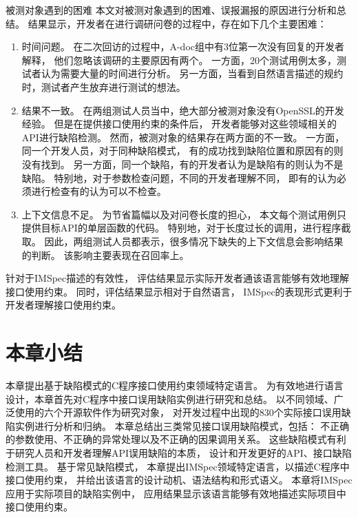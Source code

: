 {\kaishu 被测对象遇到的困难 }
本文对被测对象遇到的困难、误报漏报的原因进行分析和总结。
结果显示，开发者在进行调研问卷的过程中，存在如下几个主要困难：
\begin{enumerate}
	\item 时间问题。
	在二次回访的过程中，A-doc组中有3位第一次没有回复的开发者解释，
	他们忽略该调研的主要原因有两个。
	一方面，20个测试用例太多，测试者认为需要大量的时间进行分析。
	另一方面，当看到自然语言描述的规约时，测试者产生放弃进行测试的想法。
	\item 结果不一致。
	在两组测试人员当中，绝大部分被测对象没有OpenSSL的开发经验。
	但是在提供接口使用约束的条件后，
	开发者能够对这些领域相关的API进行缺陷检测。
	然而，被测对象的结果存在两方面的不一致。
	一方面，同一个开发人员，对于同种缺陷模式，
	有的成功找到缺陷位置和原因有的则没有找到。
	另一方面，同一个缺陷，有的开发者认为是缺陷有的则认为不是缺陷。
	特别地，对于参数检查问题，不同的开发者理解不同，
	即有的认为必须进行检查有的认为可以不检查。
	\item 上下文信息不足。
	为节省篇幅以及对问卷长度的担心，
	本文每个测试用例只提供目标API的单层函数的代码。
	特别地，对于长度过长的调用，进行程序截取。
	因此，两组测试人员都表示，很多情况下缺失的上下文信息会影响结果的判断。
	该影响主要表现在召回率上。
\end{enumerate}
	
针对于IMSpec描述的有效性，
评估结果显示实际开发者通该语言能够有效地理解接口使用约束。
同时，评估结果显示相对于自然语言，
IMSpec的表现形式更利于开发者理解接口使用约束。

\section{本章小结}
\label{sec:2.6}
本章提出基于缺陷模式的C程序接口使用约束领域特定语言。
为有效地进行语言设计，本章首先对C程序中接口误用缺陷实例进行研究和总结。
以不同领域、广泛使用的六个开源软件作为研究对象，
对开发过程中出现的830个实际接口误用缺陷实例进行分析和归纳。
本章总结出三类常见接口误用缺陷模式，包括：
不正确的参数使用、不正确的异常处理以及不正确的因果调用关系。
这些缺陷模式有利于研究人员和开发者理解API误用缺陷的本质，
设计和开发更好的API、接口缺陷检测工具。
基于常见缺陷模式，
本章提出IMSpec领域特定语言，以描述C程序中接口使用约束，
并给出该语言的设计动机、语法结构和形式语义。
本章将IMSpec应用于实际项目的缺陷实例中，
应用结果显示该语言能够有效地描述实际项目中接口使用约束。
